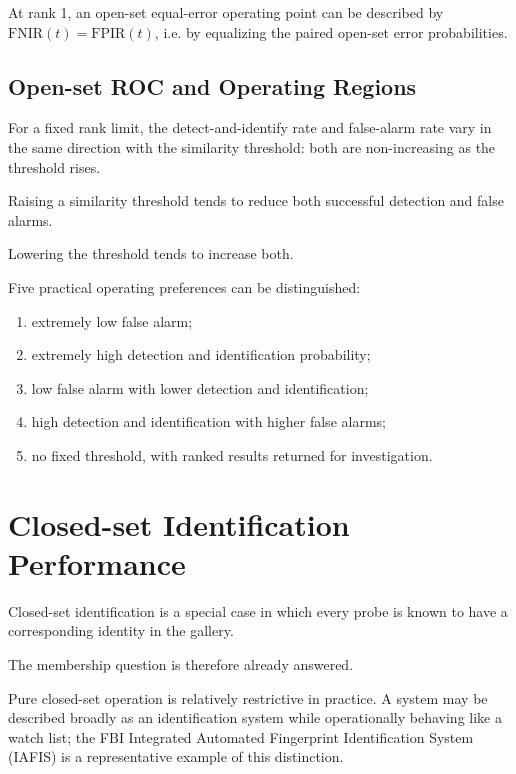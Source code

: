 \documentclass[11pt,a4paper,oneside]{report}
\begin{document}
At rank 1, an open-set equal-error operating point can be described by
\(\mathrm{FNIR}(t)=\mathrm{FPIR}(t)\), i.e. by equalizing the paired
open-set error probabilities.

\subsection{Open-set ROC and Operating Regions}

For a fixed rank limit, the detect-and-identify rate and false-alarm rate
vary in the same direction with the similarity threshold: both are
non-increasing as the threshold rises.

Raising a similarity threshold tends to reduce both successful detection
and false alarms.

Lowering the threshold tends to increase both.

Five practical operating preferences can be distinguished:

\begin{enumerate}
    \item extremely low false alarm;

    \item extremely high detection and identification probability;

    \item low false alarm with lower detection and identification;

    \item high detection and identification with higher false alarms;

    \item no fixed threshold, with ranked results returned for
    investigation.
\end{enumerate}

\section{Closed-set Identification Performance}
\label{subsec:closed-set-performance}

Closed-set identification is a special case in which every probe is
known to have a corresponding identity in the gallery.

The membership question is therefore already answered.

Pure closed-set operation is relatively restrictive in practice. A system may
be described broadly as an identification system while operationally behaving
like a watch list; the FBI Integrated Automated Fingerprint Identification
System (IAFIS) is a representative example of this distinction.
\end{document}
